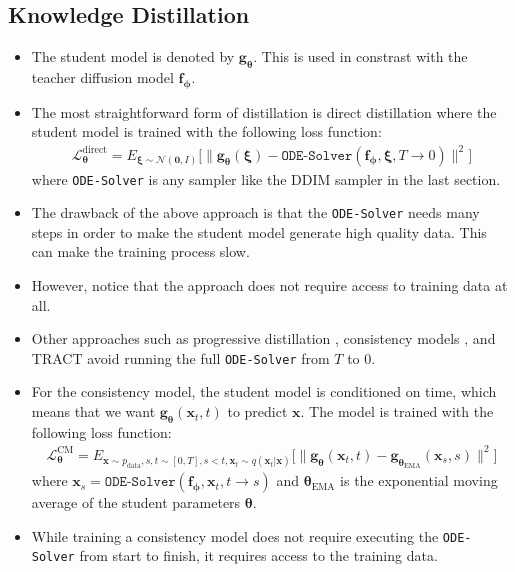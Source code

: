 \documentclass[10pt]{article}
\newcommand{\ve}[1]{\mathbf{#1}}
\newcommand{\ves}[1]{\boldsymbol{#1}}
\newcommand{\mrm}[1]{\mathrm{#1}}
\newcommand{\mcal}[1]{\mathcal{#1}}
\newcommand{\data}{\mathrm{data}}
\begin{document}
\subsection{Knowledge Distillation}

\begin{itemize}
  \item The student model is denoted by $\ve{g}_{\ves{\theta}}$. This is used in constrast with the teacher diffusion model $\ve{f}_{\ves{\phi}}$.
  
  \item The most straightforward form of distillation is direct distillation where the student model is trained with the following loss function:
  \begin{align*}
    \mcal{L}_{\ves{\theta}}^{\mrm{direct}} = E_{\ves{\xi} \sim \mcal{N}(\ve{0},I)} \big[ \| \ve{g}_{\ves{\theta}}(\ves{\xi}) - \texttt{ODE-Solver}(\ve{f}_{\ves{\phi}}, \ves{\xi}, T \rightarrow 0) \|^2  \big]
  \end{align*}
  where \texttt{ODE-Solver} is any sampler like the DDIM sampler in the last section.

  \item The drawback of the above approach is that the \texttt{ODE-Solver} needs many steps in order to make the student model generate high quality data. This can make the training process slow.
  
  \item However, notice that the approach does not require access to training data at all.
  
  \item Other approaches such as progressive distillation \cite{Salimans:2022}, consistency models \cite{Song:2023}, and TRACT \cite{Berthelot:2023} avoid running the full \texttt{ODE-Solver} from $T$ to $0$.
  
  \item For the consistency model, the student model is conditioned on time, which means that we want $\ve{g}_{\ves{\theta}}(\ve{x}_t, t)$ to predict $\ve{x}$. The model is trained with the following loss function:
  \begin{align*}
    \mcal{L}_{\ves{\theta}}^{\mrm{CM}} = E_{\ve{x} \sim p_{\data}, s,t \sim [0,T], s<t, \ve{x}_t \sim q(\ve{x}_t|\ve{x})} \big[ \| \ve{g}_{\ves{\theta}}(\ves{x}_t, t) - \ve{g}_{\ves{\theta}_\mrm{EMA}}(\ve{x}_s, s) \|^2  \big]
  \end{align*}
  where $\ve{x}_s = \texttt{ODE-Solver}(\ve{f}_{\ves{\phi}}, \ve{x}_t, t \rightarrow s)$ and $\ves{\theta}_{\mrm{EMA}}$ is the exponential moving average of the student parameters $\ves{\theta}$.

  \item While training a consistency model does not require executing the \texttt{ODE-Solver} from start to finish, it requires access to the training data.
\end{itemize}
\end{document}
